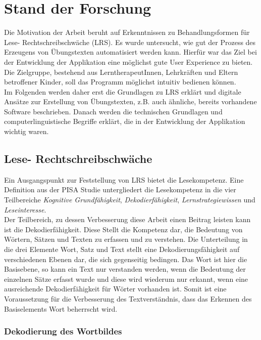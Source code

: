 
\chapter{Stand der Forschung}

Die Motivation der Arbeit beruht auf Erkenntnissen zu Behandlungsformen für Lese- Rechtschreibschwäche (LRS). Es wurde untersucht, wie gut der Prozess des Erzeugens von Übungstexten automatisiert werden kann. Hierfür war das Ziel bei der Entwicklung der Applikation eine möglichst gute User Experience zu bieten. Die Zielgruppe, bestehend aus LerntherapeutInnen, Lehrkräften und Eltern betroffener Kinder, soll das Programm möglichst intuitiv bedienen können.\\
Im Folgenden werden daher erst die Grundlagen zu LRS erklärt und digitale Ansätze zur Erstellung von Übungstexten, z.B. auch ähnliche, bereits vorhandene Software beschrieben. Danach werden die technischen Grundlagen und computerlinguistische Begriffe erklärt, die in der Entwicklung der Applikation wichtig waren.

\section{Lese- Rechtschreibschwäche}

Ein Ausgangspunkt zur Feststellung von LRS bietet die Lesekompetenz. Eine Definition aus der PISA Studie untergliedert die Lesekompetenz in die vier Teilbereiche \textit{Kognitive Grundfähigkeit}, \textit{Dekodierfähigkeit}, \textit{Lernstrategiewissen} und \textit{Leseinteresse}\cite{Schulte-Koerne2014}.\\
Der Teilbereich, zu dessen Verbesserung diese Arbeit einen Beitrag leisten kann ist die Dekodierfähigkeit. Diese Stellt die Kompetenz dar, die Bedeutung von Wörtern, Sätzen und Texten zu erfassen und zu verstehen. Die Unterteilung in die drei Elemente Wort, Satz und Text stellt eine Dekodierungsfähigkeit auf verschiedenen Ebenen dar, die sich gegenseitig bedingen. Das Wort ist hier die Basisebene, so kann ein Text nur verstanden werden, wenn die Bedeutung der einzelnen Sätze erfasst wurde und diese wird wiederum nur erkannt, wenn eine ausreichende Dekodierfähigkeit für Wörter vorhanden ist. Somit ist eine Voraussetzung für die Verbesserung des Textverständnis, dass das Erkennen des Basiselements Wort beherrscht wird.

\subsection{Dekodierung des Wortbildes}
\label{sec:dekodierung}

